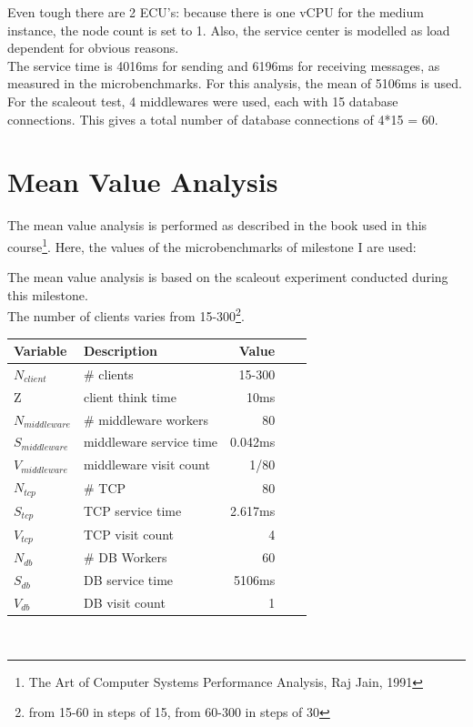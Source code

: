 \documentclass[a4paper]{article}
\begin{document}
Even tough there are 2 ECU's: because there is one vCPU for the medium instance, the node count is set to 1. Also, the service center is modelled as load dependent for obvious reasons.\\

The service time is 4016ms for sending and 6196ms for receiving messages, as measured in the microbenchmarks. For this analysis, the mean of 5106ms is used.\\

For the scaleout test, 4 middlewares were used, each with 15 database connections. This gives a total number of database connections of 4*15 = 60.


\section{Mean Value Analysis}

The mean value analysis is performed as described in the book used in this course\footnote{The Art of Computer Systems Performance Analysis, Raj Jain, 1991}. Here, the values of the microbenchmarks of milestone I are used:

\noindent The mean value analysis is based on the scaleout experiment conducted during this milestone.\\




\noindent The number of clients varies from 15-300\footnote{from 15-60 in steps of 15, from 60-300 in steps of 30}.\\


\begin{tabular}{|l|l|r|r|r|}
\hline
\textbf{Variable} & \textbf{Description} & \textbf{Value} \\ \hline
$N_{client}$ & \# clients & 15-300 \\ \hline
Z & client think time & 10ms \\ \hline
$N_{middleware}$ & \# middleware workers & 80 \\ \hline
$S_{middleware}$ & middleware service time & 0.042ms \\ \hline
$V_{middleware}$ & middleware visit count & 1/80 \\ \hline
$N_{tcp}$ & \# TCP & 80 \\ \hline
$S_{tcp}$ & TCP service time & 2.617ms \\ \hline
$V_{tcp}$ & TCP visit count & 4 \\ \hline
$N_{db}$ & \# DB Workers & 60 \\ \hline
$S_{db}$ & DB service time & 5106ms \\ \hline
$V_{db}$ & DB visit count & 1 \\ \hline
\end{tabular}
\\
\end{document}
